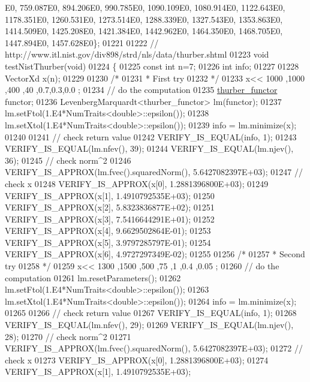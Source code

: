 \begin{DoxyCode}
      E0, 759.087E0, 894.206E0, 990.785E0, 1090.109E0, 1080.914E0, 1122.643E0, 1178.351E0, 1260.531E0, 1273.514E0, 
      1288.339E0, 1327.543E0, 1353.863E0, 1414.509E0, 1425.208E0, 1421.384E0, 1442.962E0, 1464.350E0, 1468.705E0, 
      1447.894E0, 1457.628E0\};
01221 
01222 \textcolor{comment}{// http://www.itl.nist.gov/div898/strd/nls/data/thurber.shtml}
01223 \textcolor{keywordtype}{void} testNistThurber(\textcolor{keywordtype}{void})
01224 \{
01225   \textcolor{keyword}{const} \textcolor{keywordtype}{int} n=7;
01226   \textcolor{keywordtype}{int} info;
01227 
01228   VectorXd x(n);
01229 
01230   \textcolor{comment}{/*}
01231 \textcolor{comment}{   * First try}
01232 \textcolor{comment}{   */}
01233   x<< 1000 ,1000 ,400 ,40 ,0.7,0.3,0.0 ;
01234   \textcolor{comment}{// do the computation}
01235   \hyperlink{structthurber__functor}{thurber\_functor} functor;
01236   LevenbergMarquardt<thurber\_functor> lm(functor);
01237   lm.setFtol(1.E4*NumTraits<double>::epsilon());
01238   lm.setXtol(1.E4*NumTraits<double>::epsilon());
01239   info = lm.minimize(x);
01240 
01241   \textcolor{comment}{// check return value}
01242   VERIFY\_IS\_EQUAL(info, 1);
01243   VERIFY\_IS\_EQUAL(lm.nfev(), 39);
01244   VERIFY\_IS\_EQUAL(lm.njev(), 36);
01245   \textcolor{comment}{// check norm^2}
01246   VERIFY\_IS\_APPROX(lm.fvec().squaredNorm(), 5.6427082397E+03);
01247   \textcolor{comment}{// check x}
01248   VERIFY\_IS\_APPROX(x[0], 1.2881396800E+03);
01249   VERIFY\_IS\_APPROX(x[1], 1.4910792535E+03);
01250   VERIFY\_IS\_APPROX(x[2], 5.8323836877E+02);
01251   VERIFY\_IS\_APPROX(x[3], 7.5416644291E+01);
01252   VERIFY\_IS\_APPROX(x[4], 9.6629502864E-01);
01253   VERIFY\_IS\_APPROX(x[5], 3.9797285797E-01);
01254   VERIFY\_IS\_APPROX(x[6], 4.9727297349E-02);
01255 
01256   \textcolor{comment}{/*}
01257 \textcolor{comment}{   * Second try}
01258 \textcolor{comment}{   */}
01259   x<< 1300 ,1500 ,500  ,75   ,1    ,0.4  ,0.05  ;
01260   \textcolor{comment}{// do the computation}
01261   lm.resetParameters();
01262   lm.setFtol(1.E4*NumTraits<double>::epsilon());
01263   lm.setXtol(1.E4*NumTraits<double>::epsilon());
01264   info = lm.minimize(x);
01265 
01266   \textcolor{comment}{// check return value}
01267   VERIFY\_IS\_EQUAL(info, 1);
01268   VERIFY\_IS\_EQUAL(lm.nfev(), 29);
01269   VERIFY\_IS\_EQUAL(lm.njev(), 28);
01270   \textcolor{comment}{// check norm^2}
01271   VERIFY\_IS\_APPROX(lm.fvec().squaredNorm(), 5.6427082397E+03);
01272   \textcolor{comment}{// check x}
01273   VERIFY\_IS\_APPROX(x[0], 1.2881396800E+03);
01274   VERIFY\_IS\_APPROX(x[1], 1.4910792535E+03);

\end{DoxyCode}
